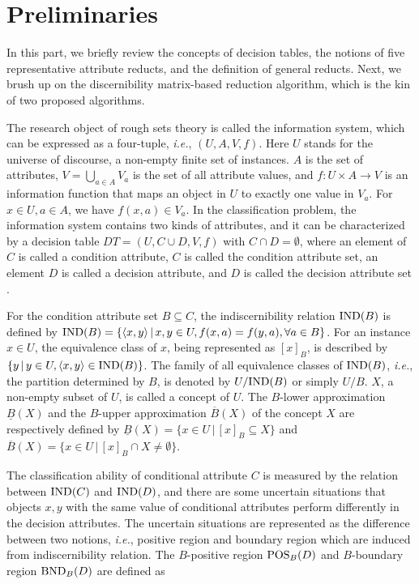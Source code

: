 \documentclass[review]{elsarticle}
\begin{document}
\section{Preliminaries}
	\par In this part, we briefly review the concepts of decision tables, the notions of five representative attribute reducts, and the definition of general reducts. Next, we brush up on the discernibility matrix-based reduction algorithm, which is the kin of two proposed algorithms.
	
	\par The research object of rough sets theory is called the information system, which can be expressed as a four-tuple, \emph{i.e.}, $( U,A,V,f )$. Here $U$ stands for the universe of discourse, a non-empty finite set of instances. $A$ is the set of attributes, $V=\bigcup_{a \in A}V_{a}$ is the set of all attribute values, and $f:U \times A \rightarrow V$ is an information function that maps an object in $U$ to exactly one value in $V_a$. For $x \in U, a \in A$, we have $f(x,a) \in V_a$. In the classification problem, the information system contains two kinds of attributes, and it can be characterized by a decision table $DT=(U,C \cup D,V,f)$ with $C \cap D = \emptyset$, where an element of $C$ is called a condition attribute, $C$ is called the condition attribute set, an element $D$ is called a decision attribute, and $D$ is called the decision attribute set \cite{liang2013accelerator}.
	\par For the condition attribute set $B \subseteq C$, the indiscernibility relation ${\rm IND}(B)$ is defined by ${\rm IND}(B) = \{\langle x,y\rangle \,|\,x,y \in U, f(x,a)=f(y,a), \forall a \in B\}$. For an instance $x \in U$, the equivalence class of $x$, being represented as $[x]_B$, is described by $\{ y \,|\,y \in U, \langle x,y\rangle  \in {\rm IND}(B)\}$. The family of all equivalence classes of ${\rm IND}(B)$, \emph{i.e.}, the partition determined by $B$, is denoted by $U/{\rm IND}(B)$ or simply $U/B$. $X$, a non-empty subset of $U$, is called a concept of $U$. The $B$-lower approximation $\underline{B}(X)$ and the $B$-upper approximation $\overline{B}(X)$ of the concept $X$ are respectively defined by $\underline{B}(X) = \{x \in U\,|\,[x]_B \subseteq X\}$ and $\overline{B}(X) = \{x \in U\,|\,[x]_B \cap X \neq \emptyset\}$.
	\par The classification ability of conditional attribute $C$ is measured by the relation between ${\rm IND}(C)$ and ${\rm IND}(D)$, and there are some uncertain situations that objects $x,y$ with the same value of conditional attributes perform differently in the decision attributes. The uncertain situations are represented as the difference between two notions, \emph{i.e.}, positive region and boundary region which are induced from indiscernibility relation. The $B$-positive region ${\rm POS}_B(D)$ and $B$-boundary region ${\rm BND}_B(D)$ are defined as
\end{document}
